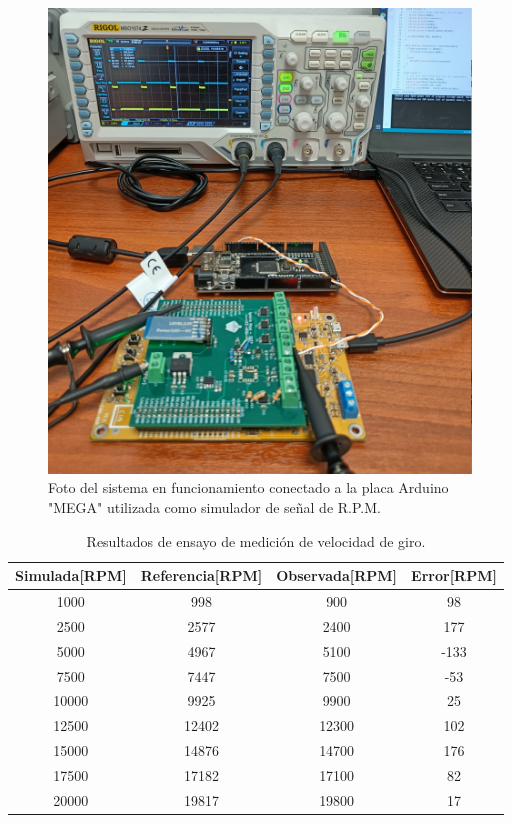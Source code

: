 \begin{figure}[htpb]
\centering
\includegraphics[width=.8\textwidth]{./Figures/foto-rpm.jpg}
\caption{Foto del sistema en funcionamiento conectado a la placa Arduino "MEGA" utilizada como simulador de señal de R.P.M.}
\label{fig:foto-rpm}
\end{figure}

\begin{table}[htpb]
	\centering
	\caption{Resultados de ensayo de medición de velocidad de giro.}
	\centering
	\begin{tabular}{c c c c}    
		\toprule
		\textbf{Simulada[RPM]} &  \textbf{Referencia[RPM]}   & \textbf{Observada[RPM]} & \textbf{Error[RPM]}\\
		\midrule
		1000	&	998 &	900 & 98\\
		2500	&	2577 & 2400 & 177\\
		5000	&	4967 & 5100 & -133 \\
		7500	&	7447 & 7500 & -53\\
		10000	&	9925 & 9900 & 25\\
		12500	&	12402 & 12300 & 102\\
		15000	&	14876 & 14700 & 176\\
		17500	&	17182 & 17100 & 82\\
		20000	&	19817 & 19800 & 17\\		
		\bottomrule
	\end{tabular}
	\label{tab:ensayo-rpm}
\end{table}

